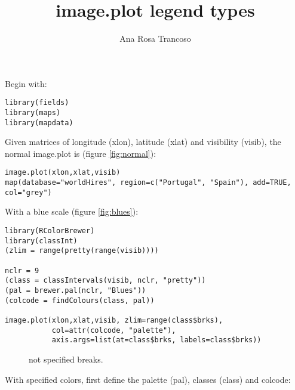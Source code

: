 \documentclass[a4paper,10pt]{article}
\title{image.plot legend types}
\author{Ana Rosa Trancoso}
\begin{document}
\maketitle


Begin with:

\begin{verbatim}
library(fields)
library(maps)
library(mapdata)
\end{verbatim} 


Given matrices of longitude (xlon), latitude (xlat) and visibility (visib), the normal image.plot is (figure \ref{fig:normal}):

\begin{verbatim}
image.plot(xlon,xlat,visib)
map(database="worldHires", region=c("Portugal", "Spain"), add=TRUE, col="grey")
\end{verbatim} 


With a blue scale (figure \ref{fig:blues}):

\begin{verbatim}
library(RColorBrewer)
library(classInt)
(zlim = range(pretty(range(visib))))

nclr = 9
(class = classIntervals(visib, nclr, "pretty"))
(pal = brewer.pal(nclr, "Blues"))
(colcode = findColours(class, pal))

image.plot(xlon,xlat,visib, zlim=range(class$brks),
           col=attr(colcode, "palette"), 
           axis.args=list(at=class$brks, labels=class$brks))

\end{verbatim} 


\begin{figure}[!htp]
  \centering
  \caption{not specified breaks.}  
  \label{fig:1}
\end{figure}

\FloatBarrier
With specified colors, first define the palette (pal), classes (class) and colcode:
\end{document}
